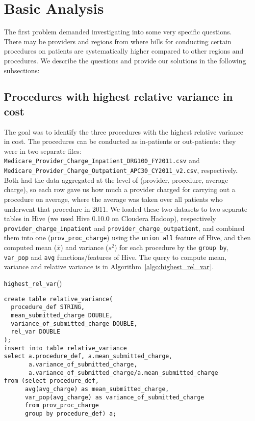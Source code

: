 \section{Basic Analysis}
\label{sec:ppr}
The first problem demanded investigating into some very specific questions. There may be providers and regions from where bills for conducting certain procedures on patients are systematically higher compared to other regions and procedures. We describe the questions and provide our solutions in the following subsections:

\subsection{Procedures with highest relative variance in cost}
\label{subsec:highest_rel_var}
The goal was to identify the three procedures with the highest relative variance in cost. The procedures can be conducted as in-patients or out-patients: they were in two separate files: \texttt{Medicare\_Provider\_Charge\_Inpatient\_DRG100\_FY2011.csv} and \texttt{Medicare\_Provider\_Charge\_Outpatient\_APC30\_CY2011\_v2.csv}, respectively. Both had the data aggregated at the level of (provider, procedure, average charge), so each row gave us how much a provider charged for carrying out a procedure on average, where the average was taken over all patients who underwent that procedure in 2011.  We loaded these two datasets to two separate tables in Hive (we used Hive 0.10.0 on Cloudera Hadoop), respectively \texttt{provider\_charge\_inpatient} and \texttt{provider\_charge\_outpatient}, and combined them into one (\texttt{prov\_proc\_charge}) using the \texttt{union all} feature of Hive, and then computed mean ($\bar{x}$) and variance ($s^2$) for each procedure by the \texttt{group by}, \texttt{var\_pop} and \texttt{avg} functions/features of Hive. The query to compute mean, variance and relative variance is in Algorithm~\ref{algo:highest_rel_var}.\\

\begin{algorithm}
\vspace{-2pt}
\caption{{\sf \texttt{highest\_rel\_var}}()}
\label{algo:highest_rel_var}
\begin{verbatim}
create table relative_variance(
  procedure_def STRING,
  mean_submitted_charge DOUBLE,
  variance_of_submitted_charge DOUBLE,
  rel_var DOUBLE
);
insert into table relative_variance
select a.procedure_def, a.mean_submitted_charge, 
       a.variance_of_submitted_charge, 
       a.variance_of_submitted_charge/a.mean_submitted_charge
from (select procedure_def, 
      avg(avg_charge) as mean_submitted_charge, 
      var_pop(avg_charge) as variance_of_submitted_charge
      from prov_proc_charge
      group by procedure_def) a;
\end{verbatim}
\end{algorithm}



